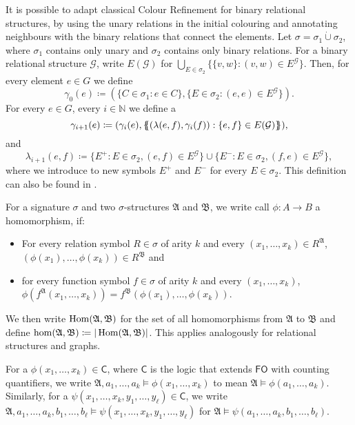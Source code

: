 It is possible to adapt classical Colour Refinement for binary relational structures, by using the unary relations in the initial colouring and annotating neighbours with the binary relations that connect the elements.
Let $\sigma=\sigma_1\operatorname{\dot{\cup}}\sigma_2$, where $\sigma_1$ contains only unary and $\sigma_2$ contains only binary relations.
For a binary relational structure $\mathcal G$, write $E(\mathcal G)$ for $\bigcup_{E\in \sigma_2} \{\{v,w \} : (v,w)\in E^{\mathcal G}\}$.
Then, for every element $e\in G$ we define
$$\gamma_0(e)\coloneqq(\{C\in \sigma_1 : e\in C\}, \{E\in \sigma_2 : (e,e)\in E^{\mathcal G}\}).$$
For every $e\in G$, every $i\in \mathbb N$ we define a
$$\gamma_{i+1}(e)\coloneqq(\gamma_i(e), \left\{\kern-.35em\left\{(\lambda(e,f), \gamma_i(f)) : \{e,f\}\in E(\mathcal G)\right\}\kern-.35em\right\}),$$
and
$$\lambda_{i+1}(e,f)\coloneqq\{E^+ : E\in\sigma_2, (e,f)\in E^{\mathcal G}\} \cup \{E^- : E\in \sigma_2, (f,e)\in E^{\mathcal G}\},$$
where we introduce to new symbols $E^+$ and $E^-$ for every $E\in \sigma_2$.
This definition can also be found in \cite{scheidt2025ColorRefinement}.

For a signature $\sigma$ and two $\sigma$-structures $\mathfrak A$ and $\mathfrak B$, we write call $\phi:A\to B$ a homomorphism, if:
\begin{itemize}
	\item For every relation symbol $R\in\sigma$ of arity $k$ and every $(x_1,\dots,x_k)\in R^{\mathfrak A}$, $(\phi(x_1),\dots,\phi(x_k))\in R^{\mathfrak B}$ and
	\item for every function symbol $f\in \sigma$ of arity $k$ and every $(x_1,\dots,x_k)$, $\phi(f^{\mathfrak A}(x_1,\dots,x_k))=f^{\mathfrak B}(\phi(x_1),\dots,\phi(x_k))$.
\end{itemize}
We then write $\operatorname{Hom}(\mathfrak A, \mathfrak B)$ for the set of all homomorphisms from $\mathfrak A$ to $\mathfrak B$ and define $\hom(\mathfrak A,\mathfrak B)\coloneqq \vert\operatorname{Hom}(\mathfrak A,\mathfrak B)\vert$.
This applies analogously for relational structures and graphs.

For a $\phi(x_1,\dots,x_k)\in\mathsf C$, where $\mathsf C$ is the logic that extends $\mathsf{FO}$ with counting quantifiers, we write $\mathfrak A,a_1,\dots,a_k\models \phi(x_1,\dots,x_k)$ to mean $\mathfrak A\models \phi(a_1,\dots,a_k)$.
Similarly, for a $\psi(x_1,\dots,x_k,y_1,\dots,y_\ell)\in\mathsf C$, we write $\mathfrak A,a_1,\dots,a_k,b_1,\dots,b_\ell\models \psi(x_1,\dots,x_k,y_1,\dots,y_\ell)$ for $\mathfrak A\models \psi(a_1,\dots,a_k,b_1,\dots,b_\ell)$.






